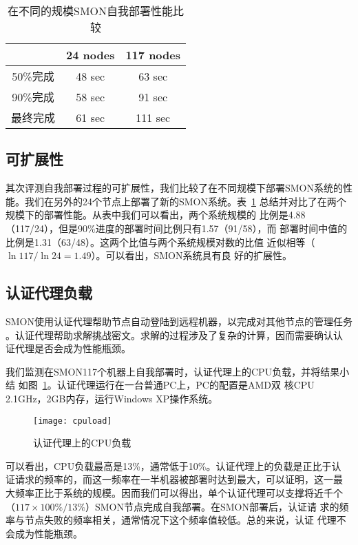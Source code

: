 
\begin{table}
\centering
  \begin{minipage}{0.8\linewidth}
    \centering
    \caption{在不同的规模SMON自我部署性能比较}
    \label{fig:scalability}
    \begin{tabular}{ccc}
    \toprule[1.5pt]
           & 24 nodes & 117 nodes\\
    \midrule[1pt]
    50\%完成 & 48 sec & 63 sec \\
    90\%完成 & 58 sec & 91 sec\\
    最终完成 & 61 sec & 111 sec\\
    \bottomrule[1.5pt]
    \end{tabular}
  \end{minipage}
\end{table}

\subsection{可扩展性}

其次评测自我部署过程的可扩展性，我们比较了在不同规模下部署SMON系统的性
能。我们在另外的24个节点上部署了新的SMON系统。表~\ref{fig:scalability}
总结并对比了在两个规模下的部署性能。从表中我们可以看出，两个系统规模的
比例是4.88（117/24），但是90\%进度的部署时间比例只有1.57（91/58），而
部署时间中值的比例是1.31（63/48）。这两个比值与两个系统规模对数的比值
近似相等（$\ln 117/\ln 24 = 1.49$）。可以看出，SMON系统具有良
好的扩展性。

\subsection{认证代理负载}

SMON使用认证代理帮助节点自动登陆到远程机器，以完成对其他节点的管理任务
。认证代理帮助求解挑战密文。求解的过程涉及了复杂的计算，因而需要确认认
证代理是否会成为性能瓶颈。

我们监测在SMON117个机器上自我部署时，认证代理上的CPU负载，并将结果小结
如图~\ref{fig:agentload}。认证代理运行在一台普通PC上，PC的配置是AMD双
核CPU 2.1GHz，2GB内存，运行Windows XP操作系统。

\begin{figure}
\centering
\texttt{[image: cpuload]}
\caption{认证代理上的CPU负载}
\label{fig:agentload}
\end{figure}

可以看出，CPU负载最高是13\%，通常低于10\%。认证代理上的负载是正比于认
证请求的频率的，而这一频率在一半机器被部署时达到最大，可以证明，这一最
大频率正比于系统的规模。因而我们可以得出，单个认证代理可以支撑将近千个
（$117 \times 100\%/13\%$）SMON节点完成自我部署。在SMON部署后，认证请
求的频率与节点失败的频率相关，通常情况下这个频率值较低。总的来说，认证
代理不会成为性能瓶颈。

